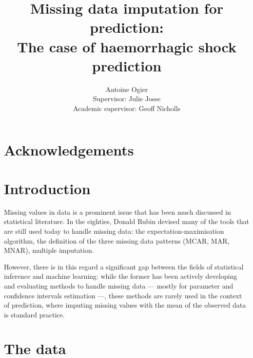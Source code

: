 \documentclass[12pt, a4paper]{article}
\title{Missing data imputation for prediction: \\ The case of haemorrhagic shock prediction}
\author{Antoine Ogier \\ Supervisor: Julie Josse \\ Academic supervisor: Geoff Nicholls}
\begin{document}
\maketitle
\thispagestyle{empty}
\tableofcontents
\newpage
{}

\section*{Acknowledgements}
\section*{Introduction}
Missing values in data is a prominent issue that has been much discussed in statistical literature. In the eighties, Donald Rubin devised many of the tools that are still used today to handle missing data: the expectation-maximisation algorithm, the definition of the three missing data patterns (MCAR, MAR, MNAR), multiple imputation. 

However, there is in this regard a significant gap between the fields of statistical inference and machine learning: while the former has been actively developing and evaluating methods to handle missing data --- mostly for parameter and confidence intervals estimation ---, these methods are rarely used in the context of prediction, where imputing missing values with the mean of the observed data is standard practice.


\section{The data}
\end{document}
